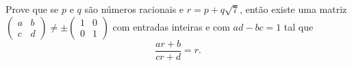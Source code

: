 Prove que se \(p\) e \(q\) são números racionais e \(r = p + q\sqrt{7}\), então existe uma matriz \(\begin{pmatrix} a & b \\ c & d \end{pmatrix} \ne \pm \begin{pmatrix} 1 & 0 \\ 0 & 1 \end{pmatrix}\) com entradas inteiras e com \(ad - bc = 1\) tal que
\[ \frac{ar + b}{cr + d} = r. \]
